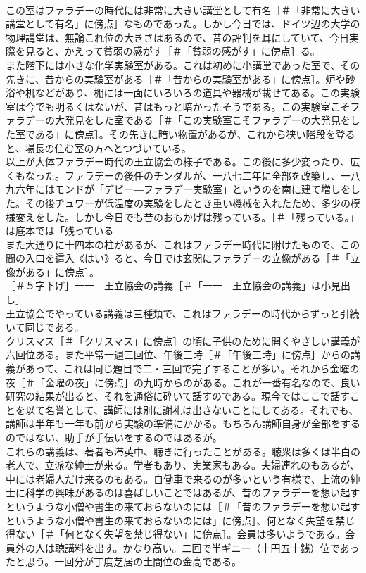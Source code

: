 \documentclass[8pt]{extreport}
\begin{document}
\begin{CJK}{UTF8}{min}
\\	この室はファラデーの時代には非常に大きい講堂として有名［＃「非常に大きい講堂として有名」に傍点］なものであった。しかし今日では、ドイツ辺の大学の物理講堂は、無論これ位の大きさはあるので、昔の評判を耳にしていて、今日実際を見ると、かえって貧弱の感がす［＃「貧弱の感がす」に傍点］る。
\\	また階下には小さな化学実験室がある。これは初めに小講堂であった室で、その先きに、昔からの実験室がある［＃「昔からの実験室がある」に傍点］。炉や砂浴や机などがあり、棚には一面にいろいろの道具や器械が載せてある。この実験室は今でも明るくはないが、昔はもっと暗かったそうである。この実験室こそファラデーの大発見をした室である［＃「この実験室こそファラデーの大発見をした室である」に傍点］。その先きに暗い物置があるが、これから狭い階段を登ると、場長の住む室の方へとつづいている。
\\	以上が大体ファラデー時代の王立協会の様子である。この後に多少変ったり、広くもなった。ファラデーの後任のチンダルが、一八七二年に全部を改築し、一八九六年にはモンドが「デビー―ファラデー実験室」というのを南に建て増しをした。その後ヂュワーが低温度の実験をしたとき重い機械を入れたため、多少の模様変えをした。しかし今日でも昔のおもかげは残っている。［＃「残っている。」は底本では「残っている　
\\	また大通りに十四本の柱があるが、これはファラデー時代に附けたもので、この間の入口を這入《はい》ると、今日では玄関にファラデーの立像がある［＃「立像がある」に傍点］。
\\	［＃５字下げ］一一　王立協会の講義［＃「一一　王立協会の講義」は小見出し］
\\	王立協会でやっている講義は三種類で、これはファラデーの時代からずっと引続いて同じである。
\\	クリスマス［＃「クリスマス」に傍点］の頃に子供のために開くやさしい講義が六回位ある。また平常一週三回位、午後三時［＃「午後三時」に傍点］からの講義があって、これは同じ題目で二・三回で完了することが多い。それから金曜の夜［＃「金曜の夜」に傍点］の九時からのがある。これが一番有名なので、良い研究の結果が出ると、それを通俗に砕いて話すのである。現今ではここで話すことを以て名誉として、講師には別に謝礼は出さないことにしてある。それでも、講師は半年も一年も前から実験の準備にかかる。もちろん講師自身が全部をするのではない、助手が手伝いをするのではあるが。
\\	これらの講義は、著者も滞英中、聴きに行ったことがある。聴衆は多くは半白の老人で、立派な紳士が来る。学者もあり、実業家もある。夫婦連れのもあるが、中には老婦人だけ来るのもある。自働車で来るのが多いという有様で、上流の紳士に科学の興味があるのは喜ばしいことではあるが、昔のファラデーを想い起すというような小僧や書生の来ておらないのには［＃「昔のファラデーを想い起すというような小僧や書生の来ておらないのには」に傍点］、何となく失望を禁じ得ない［＃「何となく失望を禁じ得ない」に傍点］。会員は多いようである。会員外の人は聴講料を出す。かなり高い。二回で半ギニー（十円五十銭）位であったと思う。一回分が丁度芝居の土間位の金高である。

\end{CJK}
\end{document}

